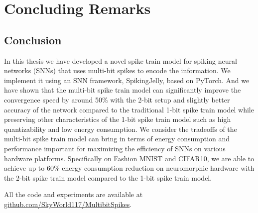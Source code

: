 \chapter{Concluding Remarks}
\label{chap:concluding_remarks}

    \section{Conclusion}
    \label{sec:conclusion}
        In this thesis we have developed a novel spike train model for spiking neural networks (SNNs) that uses multi-bit spikes to encode the information. We implement it using an SNN framework, SpikingJelly, based on PyTorch. And we have shown that the multi-bit spike train model can significantly improve the convergence speed by around 50\% with the 2-bit setup and slightly better accuracy of the network compared to the traditional 1-bit spike train model while preserving other characteristics of the 1-bit spike train model such as high quantizability and low energy consumption. We consider the tradeoffs of  the multi-bit spike train model can bring in terms of energy consumption and performance important for maximizing the efficiency of SNNs on various hardware platforms. Specifically on Fashion MNIST and CIFAR10, we are able to achieve up to 60\% energy consumption reduction on neuromorphic hardware with the 2-bit spike train model compared to the 1-bit spike train model. 

        All the code and experiments are available at \url{github.com/SkyWorld117/MultibitSpikes}.

